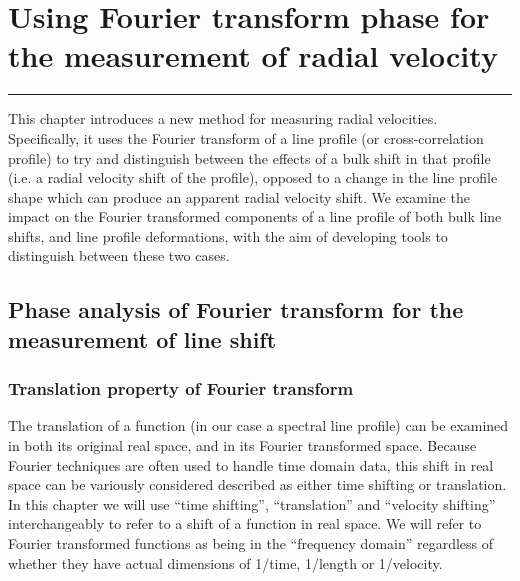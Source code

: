 \chapter{Using Fourier transform phase for the measurement of radial velocity}
\label{\thechapter}
\label{ch:Methods}


\rule{\textwidth}{1.6pt}
\minitoc
\clearpage



This chapter introduces a new method for measuring radial velocities. Specifically, it uses the Fourier transform
of a line profile (or cross-correlation profile) to try and distinguish between the effects of a bulk shift in that profile
(i.e. a radial velocity shift of the profile), opposed to a change in the line profile shape which can produce an
apparent radial velocity shift. We examine the impact on the Fourier transformed components of a line profile of both bulk line shifts, and line profile deformations, with the aim of developing tools to distinguish between these two cases.


\section{Phase analysis of Fourier transform for the measurement of line shift}
\label{\thesection}
\label{ch:FT_line_shift}


\subsection{Translation property of Fourier transform}

The translation of a function (in our case a spectral line profile) can be examined in both its original real
space, and in its Fourier transformed space. Because Fourier techniques are often used to handle time domain data,
this shift in real space can be variously considered described as either time shifting or translation. In this chapter 
we will use ``time shifting'', ``translation'' and ``velocity shifting'' interchangeably to refer to a shift of a function
in real space. We will refer to Fourier transformed functions as being in the ``frequency domain'' regardless of whether they have actual dimensions of 1/time, 1/length or 1/velocity.

